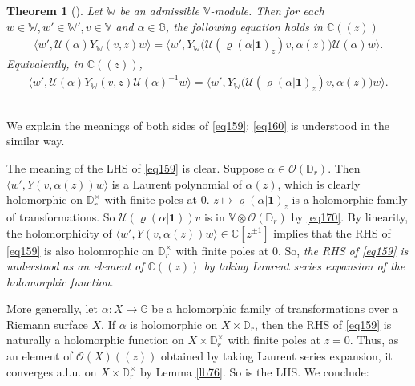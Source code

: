 \documentclass[12pt,a4paper,notitlepage]{article}
\theoremstyle{definition}
\theoremstyle{plain}
\newtheorem{thm}[df]{Theorem}
\newcommand{\mc}{\mathcal}
\newcommand{\id}{\mathbf{1}}
\newcommand{\bk}[1]{\langle {#1}\rangle}
\newcommand{\bigbk}[1]{\big\langle {#1}\big\rangle}
\newcommand{\scr}{\mathscr}
\newcommand{\Vbb}{\mathbb V}
\newcommand{\Wbb}{\mathbb W}
\newcommand{\Gbb}{\mathbb G}
\newcommand{\Cbb}{\mathbb C}
\newcommand{\Dbb}{\mathbb D}
\numberwithin{equation}{section}
\begin{document}

\begin{thm}[\cite{Hua97}]\label{lb93}
Let $\Wbb$ be an admissible $\Vbb$-module. Then for each $w\in\Wbb,w'\in\Wbb',v\in\Vbb$ and $\alpha\in\Gbb$, the following equation holds in $\Cbb((z))$
\begin{align}
\bk{w',\mc U(\alpha)Y_\Wbb(v,z)w}=\bigbk{w',Y_\Wbb\big(\mc U(\varrho(\alpha|\id)_z)v,\alpha(z)\big)\mc U(\alpha)w}.\label{eq159}
\end{align}
Equivalently, in $\Cbb((z))$,
\begin{align}
\bk{w',\mc U(\alpha)Y_\Wbb(v,z)\mc U(\alpha)^{-1}w}=\bigbk{w',Y_\Wbb\big(\mc U(\varrho(\alpha|\id)_z)v,\alpha(z)\big)w}.\label{eq160}
\end{align}
\end{thm}




\subsection{}

We explain the meanings of  both sides of \eqref{eq159}; \eqref{eq160} is understood in the similar way. 

The meaning of the LHS of \eqref{eq159} is clear. Suppose $\alpha\in\scr O(\Dbb_r)$. Then
$\bk{w',Y(v,\alpha(z))w}$ is  a Laurent polynomial of $\alpha(z)$, which is clearly holomorphic on $\Dbb_r^\times$ with finite poles at $0$. $z\mapsto \varrho(\alpha|\id)_z$ is a holomorphic family of transformations. So $\mc U(\varrho(\alpha|\id))v$ is in $\Vbb\otimes\scr O(\Dbb_r)$ by \eqref{eq170}. By linearity, the holomorphicity of $\bk{w',Y(v,\alpha(z))w}\in \Cbb[z^{\pm1}]$ implies that the RHS of \eqref{eq159} is also holomrophic on  $\Dbb_r^\times$ with finite poles at $0$. So, \emph{the RHS of \eqref{eq159} is understood as an element of $\Cbb((z))$ by taking Laurent series expansion of the holomorphic function}.

More generally, let $\alpha:X\rightarrow\Gbb$ be a holomorphic family of transformations over a Riemann surface $X$. If $\alpha$ is holomorphic on $X\times\Dbb_r$, then the RHS of \eqref{eq159} is naturally a holomorphic function on $X\times \Dbb_r^\times$ with finite poles at $z=0$. Thus, as an element of $\scr O(X)((z))$ obtained by taking Laurent series expansion, it converges a.l.u. on $X\times \Dbb_r^{\times}$ by Lemma \ref{lb76}. So is the LHS. We conclude:
\end{document}
